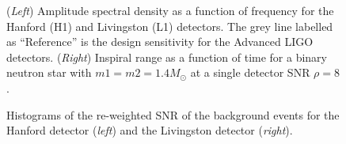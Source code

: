 \documentclass[binding=0.6cm, LaM]{sapthesis}
\begin{document}
        \begin{figure}[!t]
          \noindent
          \label{asd}
          \centering
          \caption{(\textit{Left}) Amplitude spectral density as a function of frequency for the Hanford (H1) and Livingston (L1) detectors. The grey line labelled as ``Reference'' is the design sensitivity for the Advanced LIGO detectors. (\textit{Right}) Inspiral range as a function of time for a binary neutron star with $m1 = m2 = 1.4 M_\odot$ at a single detector SNR $\rho = 8$.}
          \label{fig:asd}
        \end{figure}
        \begin{figure}[!t]
          \noindent
          \label{snrhistogram}
          \centering
          \caption{Histograms of the re-weighted SNR of the background events for the Hanford detector (\textit{left}) and the Livingston detector (\textit{right}).}
          \label{fig:snrhistogram}
        \end{figure}
\end{document}
